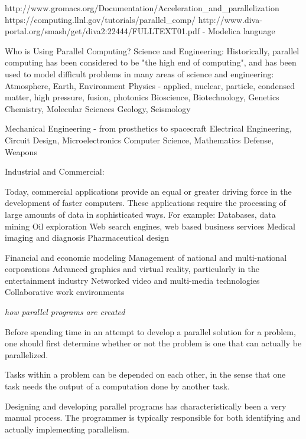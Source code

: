 http://www.gromacs.org/Documentation/Acceleration_and_parallelization
https://computing.llnl.gov/tutorials/parallel_comp/
http://www.diva-portal.org/smash/get/diva2:22444/FULLTEXT01.pdf - Modelica language

Who is Using Parallel Computing?
  Science and Engineering:
    Historically, parallel computing has been considered to be "the high end of computing", and has been used to model difficult problems in many areas of science and engineering:
        Atmosphere, Earth, Environment
        Physics - applied, nuclear, particle, condensed matter, high pressure, fusion, photonics
        Bioscience, Biotechnology, Genetics
        Chemistry, Molecular Sciences
        Geology, Seismology

        Mechanical Engineering - from prosthetics to spacecraft
        Electrical Engineering, Circuit Design, Microelectronics
        Computer Science, Mathematics
        Defense, Weapons

    Industrial and Commercial:

       Today, commercial applications provide an equal or greater driving force in the development of faster computers. These applications require the processing of large amounts of data in sophisticated ways. For example:
       Databases, data mining
       Oil exploration
       Web search engines, web based business services
       Medical imaging and diagnosis
       Pharmaceutical design

       Financial and economic modeling
       Management of national and multi-national corporations
       Advanced graphics and virtual reality, particularly in the entertainment industry
       Networked video and multi-media technologies
       Collaborative work environments

\emph{how parallel programs are created}

    Before spending time in an attempt to develop a parallel solution for a problem, one should first determine whether or not the problem is one that can actually be parallelized.

      Tasks within a problem can be depended on each other, in the sense that one task needs the output of a computation done by another task.

    Designing and developing parallel programs has characteristically been a very manual process. The programmer is typically responsible for both identifying and actually implementing parallelism.

